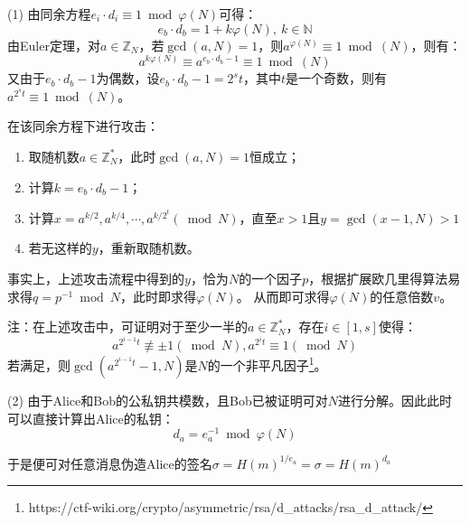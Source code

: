 \begin{Solution}
    (1) 由同余方程$e_i\cdot d_i \equiv 1 \bmod \varphi(N)$可得：
    \begin{equation}
        e_b\cdot d_b = 1 + k\varphi(N),~k\in\mathbb{N}
    \end{equation}
    由Euler定理，对$a\in \mathbb{Z}_N$，若$\gcd(a, N) = 1$，则$a^{\varphi(N)} \equiv 1 \bmod(N)$，则有：
    \begin{equation}
        a^{k\varphi(N)} \equiv a^{e_b\cdot d_b-1} \equiv 1 \bmod(N)
    \end{equation}
    又由于$e_b\cdot d_b-1$为偶数，设$e_b\cdot d_b-1 = 2^st$，其中$t$是一个奇数，则有
    $ a^{2^st} \equiv 1 \bmod(N)$。

    在该同余方程下进行攻击：
    \begin{enumerate}
        \item 取随机数$a \in \mathbb{Z}_N^*$，此时$\gcd(a, N) = 1$恒成立；
        \item 计算$k = e_b\cdot d_b - 1$；
        \item 计算$x = a^{k/2},a^{k/4},\cdots,a^{k/2^t} (\bmod N)$，直至$x>1$且$y=\gcd(x-1, N)>1$
        \item 若无这样的$y$，重新取随机数。
    \end{enumerate}

    事实上，上述攻击流程中得到的$y$，恰为$N$的一个因子$p$，根据扩展欧几里得算法易求得$q=p^{-1} \bmod N$，此时即求得$\varphi(N)$。
    从而即可求得$\varphi(N)$的任意倍数$v$。

    注：在上述攻击中，可证明对于至少一半的$a\in\mathbb{Z}_N^*$，存在$i\in[1,s]$使得：
    \begin{equation}
        a^{2^{i-1}t} \not\equiv \pm 1 (\bmod N), a^{2^{i}t} \equiv 1(\bmod N)
    \end{equation}
    若满足，则$\gcd(a^{2^{i-1}t}-1, N)$是$N$的一个非平凡因子\footnote{https://ctf-wiki.org/crypto/asymmetric/rsa/d\_attacks/rsa\_d\_attack/}。

    (2) 由于Alice和Bob的公私钥共模数，且Bob已被证明可对$N$进行分解。因此此时可以直接计算出Alice的私钥：
    \begin{equation}
        d_a = e_a^{-1} \bmod \varphi(N)
    \end{equation}

    于是便可对任意消息伪造Alice的签名$\sigma = H(m)^{1/e_a} = \sigma = H(m)^{d_a}$
\end{Solution}